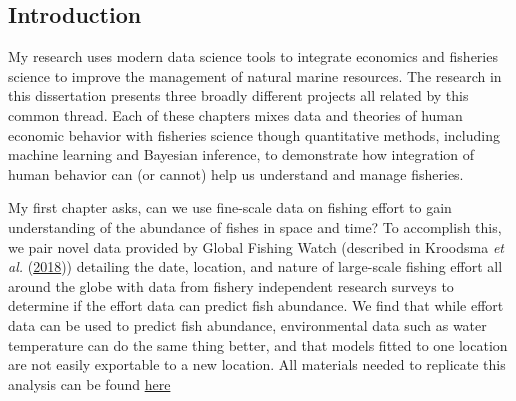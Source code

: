 \documentclass[twoside,12pt,final]{ucthesis-CA2012}
\begin{document}
\begin{ucmainmatter}

\chapter*{Introduction}\label{introduction}

My research uses modern data science tools to integrate economics and
fisheries science to improve the management of natural marine resources.
The research in this dissertation presents three broadly different
projects all related by this common thread. Each of these chapters mixes
data and theories of human economic behavior with fisheries science
though quantitative methods, including machine learning and Bayesian
inference, to demonstrate how integration of human behavior can (or
cannot) help us understand and manage fisheries.

My first chapter asks, can we use fine-scale data on fishing effort to
gain understanding of the abundance of fishes in space and time? To
accomplish this, we pair novel data provided by Global Fishing Watch
(described in Kroodsma \emph{et al.}
(\protect\hyperlink{ref-Kroodsma2018}{2018})) detailing the date,
location, and nature of large-scale fishing effort all around the globe
with data from fishery independent research surveys to determine if the
effort data can predict fish abundance. We find that while effort data
can be used to predict fish abundance, environmental data such as water
temperature can do the same thing better, and that models fitted to one
location are not easily exportable to a new location. All materials
needed to replicate this analysis can be found
\href{https://github.com/DanOvando/skynet}{here}


\end{ucmainmatter}
\end{document}
